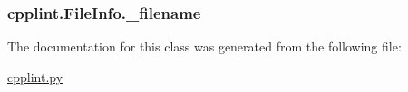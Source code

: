 \subsubsection[{\texorpdfstring{\+\_\+filename}{_filename}}]{\setlength{\rightskip}{0pt plus 5cm}cpplint.\+File\+Info.\+\_\+filename\hspace{0.3cm}{\ttfamily [private]}}\hypertarget{classcpplint_1_1FileInfo_a6c6c677b6b730b37fc5f198aaa18ab40}{}\label{classcpplint_1_1FileInfo_a6c6c677b6b730b37fc5f198aaa18ab40}


The documentation for this class was generated from the following file\+:\begin{DoxyCompactItemize}
\item 
\hyperlink{cpplint_8py}{cpplint.\+py}\end{DoxyCompactItemize}
